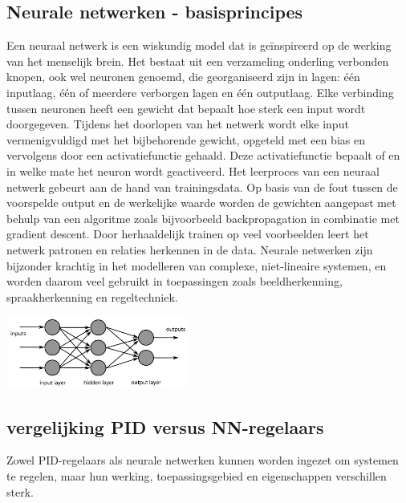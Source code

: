 \subsection{Neurale netwerken - basisprincipes}
\cite{GeeksRNN2024}\cite{Vijayvargia2018}Een neuraal netwerk is een wiskundig model dat is geïnspireerd op de werking van het menselijk brein. Het bestaat uit een verzameling onderling verbonden knopen, ook wel neuronen genoemd, die georganiseerd zijn in lagen: één inputlaag, één of meerdere verborgen lagen en één outputlaag. Elke verbinding tussen neuronen heeft een gewicht dat bepaalt hoe sterk een input wordt doorgegeven. Tijdens het doorlopen van het netwerk wordt elke input vermenigvuldigd met het bijbehorende gewicht, opgeteld met een bias en vervolgens door een activatiefunctie gehaald. Deze activatiefunctie bepaalt of en in welke mate het neuron wordt geactiveerd. Het leerproces van een neuraal netwerk gebeurt aan de hand van trainingsdata. Op basis van de fout tussen de voorspelde output en de werkelijke waarde worden de gewichten aangepast met behulp van een algoritme zoals bijvoorbeeld backpropagation in combinatie met gradient descent. Door herhaaldelijk trainen op veel voorbeelden leert het netwerk patronen en relaties herkennen in de data. Neurale netwerken zijn bijzonder krachtig in het modelleren van complexe, niet-lineaire systemen, en worden daarom veel gebruikt in toepassingen zoals beeldherkenning, spraakherkenning en regeltechniek.
\begin{center}
\centering
\includegraphics[width=0.45\textwidth]{./afbeeldingen/Neuraalnetwerkpng.png}
\label{fig:Illustratie_neuraal_netwerk}
\end{center}
\subsection{vergelijking PID versus NN-regelaars}
Zowel PID-regelaars als neurale netwerken kunnen worden ingezet om systemen te regelen, maar hun werking, toepassingsgebied en eigenschappen verschillen sterk.
